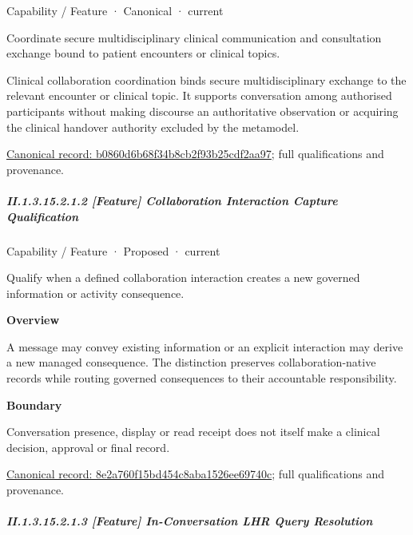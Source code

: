 \label{element:b0860d6b68f34b8cb2f93b25cdf2aa97}
{\small Capability / Feature · Canonical · current}\par

Coordinate secure multidisciplinary clinical communication and consultation exchange bound to patient encounters or clinical topics.



Clinical collaboration coordination binds secure multidisciplinary exchange to the relevant encounter or clinical topic. It supports conversation among authorised participants without making discourse an authoritative observation or acquiring the clinical handover authority excluded by the metamodel.


{\footnotesize \href{../../../../continuum/strategy/capability/feature/b0860d6b68f34b8cb2f93b25cdf2aa97.md}{Canonical record: b0860d6b68f34b8cb2f93b25cdf2aa97}; full qualifications and provenance.}\par
\subparagraph*{II.1.3.15.2.1.2 [Feature] Collaboration Interaction Capture Qualification}
\label{navigation:II.1.3.15.2.1.2}

\label{element:8e2a760f15bd454c8aba1526ee69740c}
{\small Capability / Feature · Proposed · current}\par

Qualify when a defined collaboration interaction creates a new governed information or activity consequence.



\textbf{Overview}



A message may convey existing information or an explicit interaction may derive a new managed consequence. The distinction preserves collaboration-native records while routing governed consequences to their accountable responsibility.



\textbf{Boundary}



Conversation presence, display or read receipt does not itself make a clinical decision, approval or final record.


{\footnotesize \href{../../../../continuum/strategy/capability/feature/8e2a760f15bd454c8aba1526ee69740c.md}{Canonical record: 8e2a760f15bd454c8aba1526ee69740c}; full qualifications and provenance.}\par
\subparagraph*{II.1.3.15.2.1.3 [Feature] In-Conversation LHR Query Resolution}
\label{navigation:II.1.3.15.2.1.3}

